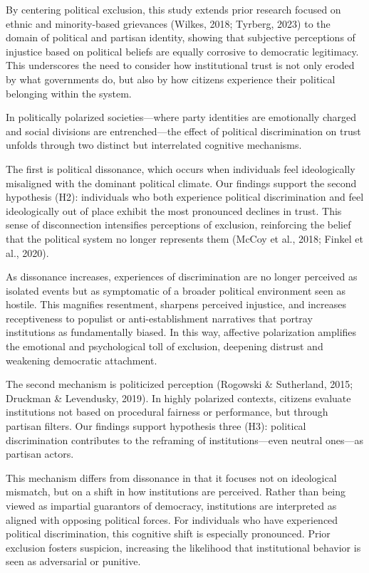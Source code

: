\documentclass{article}
\begin{document}
By centering political exclusion, this study extends prior research focused on ethnic and minority-based grievances (Wilkes, 2018; Tyrberg, 2023) to the domain of political and partisan identity, showing that subjective perceptions of injustice based on political beliefs are equally corrosive to democratic legitimacy. This underscores the need to consider how institutional trust is not only eroded by what governments do, but also by how citizens experience their political belonging within the system.

In politically polarized societies—where party identities are emotionally charged and social divisions are entrenched—the effect of political discrimination on trust unfolds through two distinct but interrelated cognitive mechanisms.

The first is political dissonance, which occurs when individuals feel ideologically misaligned with the dominant political climate. Our findings support the second hypothesis (H2): individuals who both experience political discrimination and feel ideologically out of place exhibit the most pronounced declines in trust. This sense of disconnection intensifies perceptions of exclusion, reinforcing the belief that the political system no longer represents them (McCoy et al., 2018; Finkel et al., 2020).

As dissonance increases, experiences of discrimination are no longer perceived as isolated events but as symptomatic of a broader political environment seen as hostile. This magnifies resentment, sharpens perceived injustice, and increases receptiveness to populist or anti-establishment narratives that portray institutions as fundamentally biased. In this way, affective polarization amplifies the emotional and psychological toll of exclusion, deepening distrust and weakening democratic attachment.

The second mechanism is politicized perception (Rogowski \& Sutherland, 2015; Druckman \& Levendusky, 2019). In highly polarized contexts, citizens evaluate institutions not based on procedural fairness or performance, but through partisan filters. Our findings support hypothesis three (H3): political discrimination contributes to the reframing of institutions—even neutral ones—as partisan actors.

This mechanism differs from dissonance in that it focuses not on ideological mismatch, but on a shift in how institutions are perceived. Rather than being viewed as impartial guarantors of democracy, institutions are interpreted as aligned with opposing political forces. For individuals who have experienced political discrimination, this cognitive shift is especially pronounced. Prior exclusion fosters suspicion, increasing the likelihood that institutional behavior is seen as adversarial or punitive.
\end{document}

